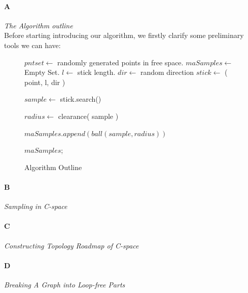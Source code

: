 \documentclass[11pt]{article}
\begin{document}
\paragraph{A} \emph{The Algorithm outline} \hfill \\
\indent Before starting introducing our algorithm, we firstly clarify some preliminary tools we can have: 

\begin{figure}
  \begin{algorithmic}[1]
    \State $pntset \gets$ randomly generated points in free space.
    \State $maSamples \gets$ Empty Set.
    \State $l \gets $ stick length.	 
		\State $dir \gets$ random direction  
		\State $stick \gets$ ( point, l, dir ) 
		
			\indent\indent $sample \gets$ stick.search()
			
			\indent\indent $radius \gets$ clearance( sample ) 
			
			\indent\indent $maSamples.append( ball(sample, radius) )$
		\EndIf
	\EndFor
	
	\Return $maSamples$;
  \EndFunction
  \end{algorithmic}
  \caption{Algorithm Outline}
\end{figure}

\paragraph{B} \emph{Sampling in C-space} \hfill \\

\paragraph{C} \emph{Constructing Topology Roadmap of C-space} \hfill \\

\paragraph{D} \emph{Breaking A Graph into Loop-free Parts} \hfill\\
\end{document}
